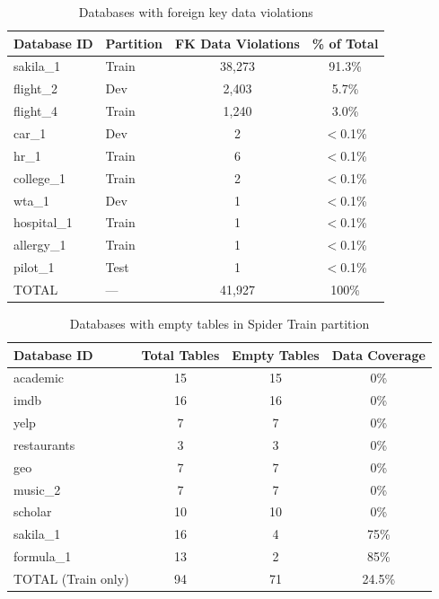 \documentclass[print]{einformatica}
\begin{document}
\begin{table}[H]
    \caption{Databases with foreign key data violations}
    \label{tab:schema_fk_data_violations}
    \centering
    \footnotesize
    \begin{tabular}{llcc}
        \toprule
        \textbf{Database ID} & \textbf{Partition} & \textbf{FK Data Violations} & \textbf{\% of Total} \\
        \midrule
        sakila\_1 & Train & 38,273 & 91.3\% \\
        flight\_2 & Dev & 2,403 & 5.7\% \\
        flight\_4 & Train & 1,240 & 3.0\% \\
        car\_1 & Dev & 2 & $<$0.1\% \\
        hr\_1 & Train & 6 & $<$0.1\% \\
        college\_1 & Train & 2 & $<$0.1\% \\
        wta\_1 & Dev & 1 & $<$0.1\% \\
        hospital\_1 & Train & 1 & $<$0.1\% \\
        allergy\_1 & Train & 1 & $<$0.1\% \\
        pilot\_1 & Test & 1 & $<$0.1\% \\
        \midrule
        TOTAL & --- & 41,927 & 100\% \\
        \bottomrule
    \end{tabular}
\end{table}

\begin{table}[H]
    \caption{Databases with empty tables in Spider Train partition}
    \label{tab:schema_empty_tables}
    \centering
    \footnotesize
    \begin{tabular}{lccc}
        \toprule
        \textbf{Database ID} & \textbf{Total Tables} & \textbf{Empty Tables} & \textbf{Data Coverage} \\
        \midrule
        academic & 15 & 15 & 0\% \\
        imdb & 16 & 16 & 0\% \\
        yelp & 7 & 7 & 0\% \\
        restaurants & 3 & 3 & 0\% \\
        geo & 7 & 7 & 0\% \\
        music\_2 & 7 & 7 & 0\% \\
        scholar & 10 & 10 & 0\% \\
        sakila\_1 & 16 & 4 & 75\% \\
        formula\_1 & 13 & 2 & 85\% \\
        \midrule
        TOTAL (Train only) & 94 & 71 & 24.5\% \\
        \bottomrule
    \end{tabular}
\end{table}
\end{document}
